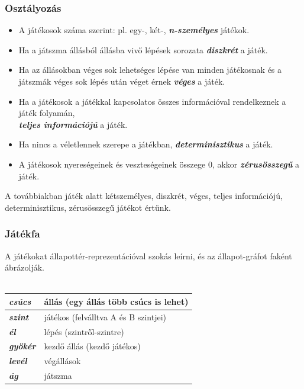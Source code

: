 \documentclass[12pt,margin=0px]{article}
\begin{document}
{    \subsubsection*{Osztályozás}

    \begin{itemize}
        \item A játékosok száma szerint: pl. egy-, két-, \emph{\textbf{n-személyes}} játékok.
        \item Ha a játszma állásból állásba vivő lépések sorozata \emph{\textbf{diszkrét}} a játék.
        \item Ha az állásokban véges sok lehetséges lépése van minden játékosnak és a játszmák véges sok lépés után véget érnek \emph{\textbf{véges}} a játék.
        \item Ha a játékosok a játékkal kapcsolatos összes információval rendelkeznek a játék folyamán,\\
        \emph{\textbf{teljes információjú}} a játék.
        \item Ha nincs a véletlennek szerepe a játékban, \emph{\textbf{determinisztikus}} a játék.
        \item A játékosok nyereségeinek és veszteségeinek összege 0, akkor \emph{\textbf{zérusösszegű}} a játék.\\
    \end{itemize}
    
    \noindent A továbbiakban játék alatt kétszemélyes, diszkrét, véges, teljes információjú, determinisztikus, zérusösszegű játékot értünk.

    \subsubsection*{Játékfa}
   	
    \noindent A játékokat állapottér-reprezentációval szokás leírni, és az állapot-gráfot faként ábrázolják.\\\\
    {\small
    \renewcommand{\arraystretch}{2}
        \begin{tabular}{ l|L }
           \textit{\textbf{csúcs}}  & állás (egy állás több csúcs is lehet)
           \\ \hline
           \textit{\textbf{szint}}  & játékos (felválltva A és B szintjei)
           \\ \hline
           \textit{\textbf{él}}     & lépés (szintről-szintre)
           \\ \hline
           \textit{\textbf{gyökér}} & kezdő állás (kezdő játékos)
           \\ \hline
           \textit{\textbf{levél}}  & végállások
           \\ \hline
           \textit{\textbf{ág}}     & játszma
           \\
        \end{tabular}
    \renewcommand{\arraystretch}{1}}\\

}
\end{document}
